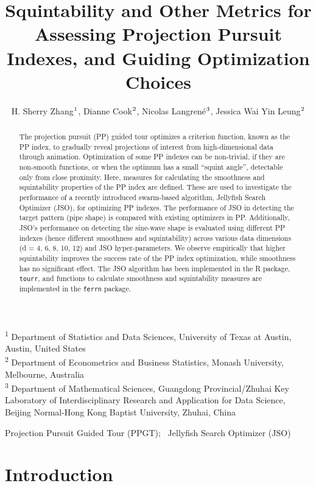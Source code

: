 \documentclass[
  12pt,
]{interact}
\title{Squintability and Other Metrics for Assessing Projection Pursuit
Indexes, and Guiding Optimization Choices}
\author{H. Sherry Zhang$\textsuperscript{1}$, Dianne
Cook$\textsuperscript{2}$, Nicolas
Langrené$\textsuperscript{3}$, Jessica Wai Yin
Leung$\textsuperscript{2}$}
\theoremstyle{plain}
\begin{document}
\captionsetup{labelsep=space}
\maketitle
\textsuperscript{1} Department of Statistics and Data
Sciences, University of Texas at Austin, Austin, United
States\\ \textsuperscript{2} Department of Econometrics and Business
Statistics, Monash
University, Melbourne, Australia\\ \textsuperscript{3} Department of
Mathematical Sciences, Guangdong Provincial/Zhuhai Key Laboratory of
Interdisciplinary Research and Application for Data Science, Beijing
Normal-Hong Kong Baptist University, Zhuhai, China
\begin{abstract}
The projection pursuit (PP) guided tour optimizes a criterion function,
known as the PP index, to gradually reveal projections of interest from
high-dimensional data through animation. Optimization of some PP indexes
can be non-trivial, if they are non-smooth functions, or when the
optimum has a small ``squint angle'', detectable only from close
proximity. Here, measures for calculating the smoothness and
squintability properties of the PP index are defined. These are used to
investigate the performance of a recently introduced swarm-based
algorithm, Jellyfish Search Optimizer (JSO), for optimizing PP indexes.
The performance of JSO in detecting the target pattern (pipe shape) is
compared with existing optimizers in PP. Additionally, JSO's performance
on detecting the sine-wave shape is evaluated using different PP indexes
(hence different smoothness and squintability) across various data
dimensions (d = 4, 6, 8, 10, 12) and JSO hyper-parameters. We observe
empirically that higher squintability improves the success rate of the
PP index optimization, while smoothness has no significant effect. The
JSO algorithm has been implemented in the R package, \texttt{tourr}, and
functions to calculate smoothness and squintability measures are
implemented in the \texttt{ferrn} package.
\end{abstract}
\begin{keywords}
\def\sep{;\ }
Projection Pursuit Guided Tour (PPGT)\sep 
Jellyfish Search Optimizer (JSO)
\end{keywords}


\section{Introduction}\label{introduction}
\end{document}

